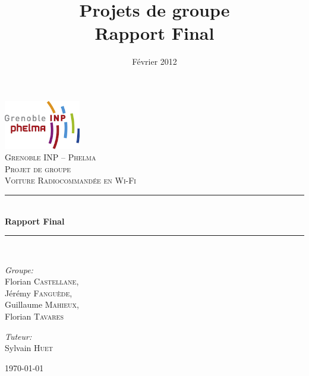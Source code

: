 \documentclass[a4paper,12pt]{report}
\title{Projets de groupe \\ Rapport Final}
\author{\bsc{F. Castellane} \and \bsc{J. Fanguede} \and \bsc{G. Mahieux} \and \bsc{F. Tavares}  }
\date{Février 2012}
\newcommand{\HRule}{\rule{\linewidth}{0.5mm}}
\begin{document}
\setlength{\parskip}{1ex plus 0.5ex minus 0.2ex}

\begin{titlepage}
	\begin{center}
	
	\includegraphics[width=0.25\textwidth]{images/smallphelma.png}\\[1.0cm]    

	\textsc{\Large Grenoble INP -- Phelma}\\[0.5cm]

	\textsc{\huge Projet de groupe}\\[3.5cm]

	\textsc{\huge Voiture Radiocommandée en Wi-Fi}\\[0.6cm]
	
	\HRule \\[0.4cm]
	{ \huge \bfseries Rapport Final}\\[0.1cm]

	\HRule \\[3.5cm]
	

	\begin{minipage}{0.3\textwidth}
		\begin{flushleft} \large
			\emph{Groupe:}\\
			Florian \textsc{Castellane}, \\ Jérémy \textsc{Fanguède}, \\ Guillaume \textsc{Mahieux}, \\ Florian \textsc{Tavares}
		\end{flushleft}
	\end{minipage}
	\begin{minipage}{0.4\textwidth}
		\begin{flushright} \large
			\emph{Tuteur:} \\
			Sylvain \textsc{Huet}
		\end{flushright}
	\end{minipage}
	\vfill

{\large \today}

\end{center}

\end{titlepage}
\end{document}
